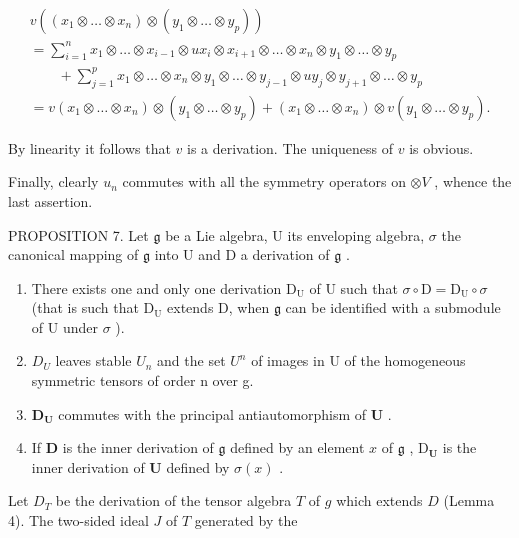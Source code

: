 \[
\begin{array}{l} v ((x _ {1} \otimes \dots \otimes x _ {n}) \otimes (y _ {1} \otimes \dots \otimes y _ {p})) \\ = \sum_ {i = 1} ^ {n} x _ {1} \otimes \dots \otimes x _ {i - 1} \otimes u x _ {i} \otimes x _ {i + 1} \otimes \dots \otimes x _ {n} \otimes y _ {1} \otimes \dots \otimes y _ {p} \\ \qquad + \sum_ {j = 1} ^ {p} x _ {1} \otimes \dots \otimes x _ {n} \otimes y _ {1} \otimes \dots \otimes y _ {j - 1} \otimes u y _ {j} \otimes y _ {j + 1} \otimes \dots \otimes y _ {p} \\ = v (x _ {1} \otimes \dots \otimes x _ {n}) \otimes (y _ {1} \otimes \dots \otimes y _ {p}) + (x _ {1} \otimes \dots \otimes x _ {n}) \otimes v (y _ {1} \otimes \dots \otimes y _ {p}). \end{array}
\]

By linearity it follows that \(v\) is a derivation. The uniqueness of \(v\) is obvious.

Finally, clearly \(u_{n}\) commutes with all the symmetry operators on \(\otimes V\) , whence the last assertion.

PROPOSITION 7. Let \(\mathfrak{g}\) be a Lie algebra, U its enveloping algebra, \(\sigma\) the canonical mapping of \(\mathfrak{g}\) into U and D a derivation of \(\mathfrak{g}\) .

\begin{enumerate}
\def\labelenumi{(\alph{enumi})}
\item
  There exists one and only one derivation \(\mathrm{D_U}\) of U such that \(\sigma \circ \mathrm{D} = \mathrm{D_U} \circ \sigma\) (that is such that \(\mathrm{D_U}\) extends D, when \(\mathfrak{g}\) can be identified with a submodule of U under \(\sigma\) ).
\item
  \(D_{U}\) leaves stable \(U_{n}\) and the set \(U^{n}\) of images in U of the homogeneous symmetric tensors of order n over g.
\item
  \(\mathbf{D}_{\mathbf{U}}\) commutes with the principal antiautomorphism of \(\mathbf{U}\) .
\item
  If \(\mathbf{D}\) is the inner derivation of \(\mathfrak{g}\) defined by an element \(x\) of \(\mathfrak{g}\) , \(\mathrm{D}_{\mathbf{U}}\) is the inner derivation of \(\mathbf{U}\) defined by \(\sigma(x)\) .
\end{enumerate}

Let \(D_T\) be the derivation of the tensor algebra \(T\) of \(g\) which extends \(D\) (Lemma 4). The two-sided ideal \(J\) of \(T\) generated by the

